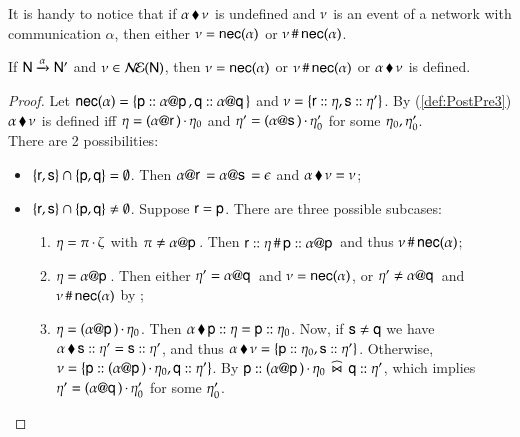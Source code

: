   
 
  
 It is handy to notice that if ${\alpha}\,\blacklozenge\,{\nu}$ is undefined and $\nu$ is an event of a network with communication $\alpha$, then either $\nu={\sf nec}(\alpha)$ or $\nu\,\#\,{\sf nec}(\alpha)$. 

\begin{lemma} 
If ${\sf N}\xrightarrow{\alpha}{\sf N}'$ and $\nu\in\mathcal{N\!E}({\sf N})$, then $\nu={\sf nec}(\alpha)$ or $\nu\,\#\,{\sf nec}(\alpha)$ or ${\alpha}\,\blacklozenge\,{\nu}$ is defined.
\end{lemma}


\begin{proof}
Let
${\sf nec}(\alpha) =\{{\sf p}:: \alpha @ {\sf p}\,,
  {\sf q}:: \alpha @ {\sf q}\,\}$ and
$\nu=\{{\sf r}:: \eta, {\sf s}:: \eta'\}$.  By
(\ref{def:PostPre3}) ${\alpha}\,\blacklozenge\,{\nu}$ is
defined iff $\eta= (\alpha @ {\sf r}\,)\,{\cdot}\,\eta_0$ and
$\eta'= (\alpha @ {\sf s}\,)\,{\cdot}\,\eta'_0$ for some
$\eta_0, \eta'_0$.\\
There are 2 possibilities:
\begin{itemize}
\item
$\{{\sf r},{\sf s}\} \cap \{{\sf p},{\sf q}\} = \emptyset$. Then
$\alpha @ {\sf r}\, = \alpha @ {\sf s}\, = \epsilon$ and
${\alpha}\,\blacklozenge\,{\nu} = \nu$;
\item $\{{\sf r},{\sf s}\} \cap \{{\sf p},{\sf q}\} \neq \emptyset$. 
Suppose ${\sf r} = {\sf p}$. There are three possible subcases:
\begin{enumerate}
\item {} $\eta = \pi\,{\cdot}\,\zeta$ with $\pi \neq \alpha @ {\sf p}\,$.
Then ${\sf r}:: \eta \,\#\, {\sf p}:: \alpha @ {\sf p}\,$ and
thus $\nu\,\#\,{\sf nec}(\alpha)$;
%
\item {} 
$\eta = \alpha @ {\sf p}\,$. Then either
$\eta'= \alpha @ {\sf q}\,$ and $\nu={\sf nec}(\alpha)$, or
$\eta' \neq \alpha @ {\sf q}\,$ 
and $\nu\,\#\,{\sf nec}(\alpha)$ by
;
\item {} 
$\eta = (\alpha @ {\sf p}\,)\,{\cdot}\,\eta_0$. Then 
${\alpha}\,\blacklozenge\,{{\sf p}:: \eta} = {\sf p}:: \eta_0$. Now, if
${\sf s} \neq {\sf q}$ we have ${\alpha}\,\blacklozenge\,{{\sf s}:: \eta'} =
{\sf s}:: \eta'$, and thus ${\alpha}\,\blacklozenge\,{\nu} =
\{{\sf p}:: \eta_0, {\sf s}:: \eta'\}$.
Otherwise,
$\nu=\{{\sf p}:: (\alpha @ {\sf p}\,)\,{\cdot}\,\eta_0,
  {\sf q}:: \eta'\}$. By  ${\sf p}:: (\alpha @ {\sf p}\,)\,{\cdot}\,\eta_0\;\,\widehat\Join\;\, {\sf q}:: \eta'$, which implies 
  $\eta'=(\alpha @ {\sf q}\,)\,{\cdot}\,\eta'_0$ for some $\eta'_0$.
\end{enumerate}
\end{itemize} 
\end{proof}

